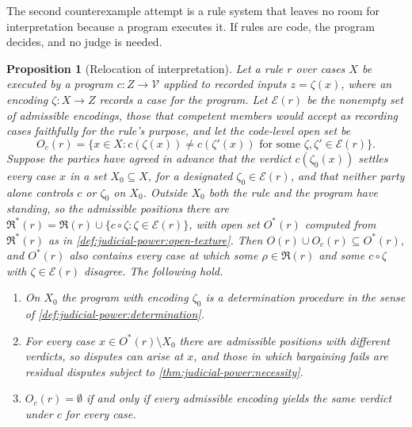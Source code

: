 \documentclass[11pt,letterpaper]{article}
\newtheorem{proposition}[theorem]{Proposition}
\theoremstyle{definition}
\theoremstyle{remark}
\newcommand{\Read}{\mathfrak{R}}
\begin{document}
The second counterexample attempt is a rule system that leaves no room for interpretation because a program executes it. If rules are code, the program decides, and no judge is needed.

\begin{proposition}[Relocation of interpretation]
\label{prop:judicial-power:relocation}
Let a rule $r$ over cases $X$ be executed by a program $c:Z\to\mathcal{V}$ applied to recorded inputs $z=\zeta(x)$, where an encoding $\zeta:X\to Z$ records a case for the program. Let $\mathcal{E}(r)$ be the nonempty set of admissible encodings, those that competent members would accept as recording cases faithfully for the rule's purpose, and let the code-level open set be
\[
O_c(r)=\{x\in X : c(\zeta(x))\neq c(\zeta'(x))\text{ for some }\zeta,\zeta'\in\mathcal{E}(r)\}.
\]
Suppose the parties have agreed in advance that the verdict $c(\zeta_0(x))$ settles every case $x$ in a set $X_0\subseteq X$, for a designated $\zeta_0\in\mathcal{E}(r)$, and that neither party alone controls $c$ or $\zeta_0$ on $X_0$. Outside $X_0$ both the rule and the program have standing, so the admissible positions there are $\Read^{*}(r)=\Read(r)\cup\{c\circ\zeta:\zeta\in\mathcal{E}(r)\}$, with open set $O^{*}(r)$ computed from $\Read^{*}(r)$ as in \cref{def:judicial-power:open-texture}. Then $O(r)\cup O_c(r)\subseteq O^{*}(r)$, and $O^{*}(r)$ also contains every case at which some $\rho\in\Read(r)$ and some $c\circ\zeta$ with $\zeta\in\mathcal{E}(r)$ disagree. The following hold.
\begin{enumerate}[label=(\roman*)]
\item On $X_0$ the program with encoding $\zeta_0$ is a determination procedure in the sense of \cref{def:judicial-power:determination}.
\item For every case $x\in O^{*}(r)\setminus X_0$ there are admissible positions with different verdicts, so disputes can arise at $x$, and those in which bargaining fails are residual disputes subject to \cref{thm:judicial-power:necessity}.
\item $O_c(r)=\emptyset$ if and only if every admissible encoding yields the same verdict under $c$ for every case.
\end{enumerate}
\end{proposition}
\end{document}
